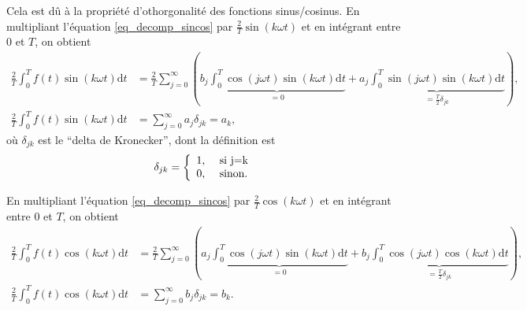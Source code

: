 \documentclass[a4paper,12pt]{book}
\newcommand{\dd}{\mathrm{d}}
\begin{document}
Cela est dû à la propriété d'othorgonalité des fonctions sinus/cosinus.
En multipliant l'équation \eqref{eq_decomp_sincos} par $\frac{2}{T}\sin(k \omega t)$ et en intégrant 
entre $0$ et $T$, on obtient
 \begin{align}
\frac{2}{T}\int_0^T f(t)\sin(k\omega t)\dd t&=\frac{2}{T}\sum_{j=0}^\infty \left(b_j\underbrace{\int_0^T\cos(j\omega t)\sin(k\omega t)\dd t}_{=0}+a_j\underbrace{\int_0^T\sin(j\omega t)\sin(k \omega t)\dd t}_{=\frac{T}{2}\delta_{jk}}\right),\nonumber\\
\frac{2}{T}\int_0^T f(t)\sin(k\omega t)\dd t&=\sum_{j=0}^\infty a_j \delta_{jk}=a_k,
\end{align}
où $\delta_{jk}$ est le ``delta de Kronecker'', dont la définition est
\begin{equation}
 \delta_{jk}=\left\{\begin{array}{ll}
                $1,$&$\mbox{ si }j=k$\\
                $0,$&$\mbox{ sinon.}$
               \end{array}\right.
\end{equation}

En multipliant l'équation \eqref{eq_decomp_sincos} par $\frac{2}{T}\cos(k \omega t)$ et en intégrant 
entre $0$ et $T$, on obtient
 \begin{align}
\frac{2}{T}\int_0^T f(t)\cos(k\omega t)\dd t&=\frac{2}{T}\sum_{j=0}^\infty \left(a_j\underbrace{\int_0^T\cos(j\omega t)\sin(k\omega t)\dd t}_{=0}+b_j\underbrace{\int_0^T\cos(j\omega t)\cos(k \omega t)\dd t}_{=\frac{T}{2}\delta_{jk}}\right),\nonumber\\
\frac{2}{T}\int_0^T f(t)\cos(k\omega t)\dd t&=\sum_{j=0}^\infty b_j \delta_{jk}=b_k.
\end{align}
\end{document}
